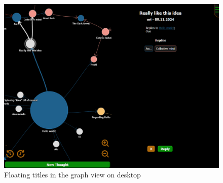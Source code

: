 \begin{figure}[p]
    \includegraphics[width=130mm, keepaspectratio]{img/afantazie_floating_titles.png}
    \caption{Floating titles in the graph view on desktop}
    \label{obr:afantazie_floating_titles}
\end{figure}


